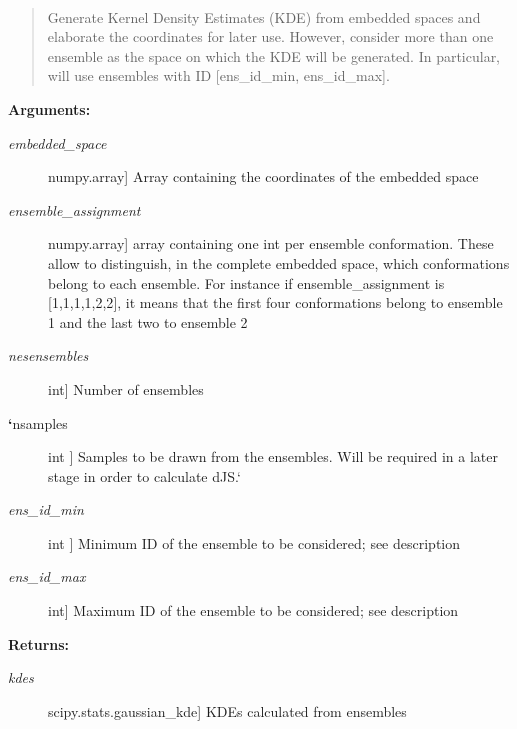 \documentclass[letterpaper,10pt,english]{sphinxmanual}
\begin{document}

\begin{fulllineitems}
\label{index:encore.similarity.cumulative_gen_kde_pdfs}~\begin{quote}

Generate Kernel Density Estimates (KDE) from embedded spaces and elaborate the coordinates for later use. However, consider more than one ensemble as the space on which the KDE will be generated. In particular, will use ensembles with ID {[}ens\_id\_min, ens\_id\_max{]}.
\end{quote}

\textbf{Arguments:}
\begin{description}
\item[{\emph{embedded\_space}}] \leavevmode{[}numpy.array{]}
Array containing the coordinates of the embedded space

\item[{\emph{ensemble\_assignment}}] \leavevmode{[}numpy.array{]}
array containing one int per ensemble conformation. These allow to distinguish, in the complete embedded space, which conformations belong to each ensemble. For instance if ensemble\_assignment is {[}1,1,1,1,2,2{]}, it means that the first four conformations belong to ensemble 1 and the last two to ensemble 2

\item[{\emph{nesensembles}}] \leavevmode{[}int{]}
Number of ensembles

\item[{{\color{red}\bfseries{}{}`}nsamples}] \leavevmode{[}int {]}
Samples to be drawn from the ensembles. Will be required in a later stage in order to calculate dJS.{}`

\item[{\emph{ens\_id\_min}}] \leavevmode{[}int {]}
Minimum ID of the ensemble to be considered; see description

\item[{\emph{ens\_id\_max}}] \leavevmode{[}int{]}
Maximum ID of the ensemble to be considered; see description

\end{description}

\textbf{Returns:}
\begin{description}
\item[{\emph{kdes}}] \leavevmode{[}scipy.stats.gaussian\_kde{]}
KDEs calculated from ensembles


\end{description}
\end{fulllineitems}
\end{document}
